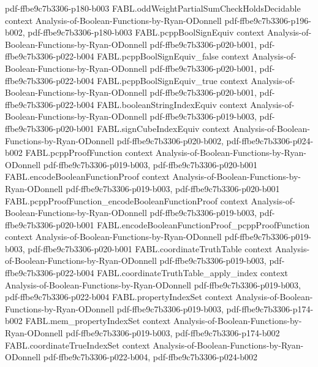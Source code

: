 \begin{theorem}
  {pdf-ffbe9c7b3306-p180-b003}
\proofstep
  {FABL.oddWeightPartialSumCheckHoldsDecidable}
  {context}
  {Analysis-of-Boolean-Functions-by-Ryan-ODonnell}
  {pdf-ffbe9c7b3306-p196-b002,
    pdf-ffbe9c7b3306-p180-b003}
\proofstep
  {FABL.pcppBoolSignEquiv}
  {context}
  {Analysis-of-Boolean-Functions-by-Ryan-ODonnell}
  {pdf-ffbe9c7b3306-p020-b001,
    pdf-ffbe9c7b3306-p022-b004}
\proofstep
  {FABL.pcppBoolSignEquiv_false}
  {context}
  {Analysis-of-Boolean-Functions-by-Ryan-ODonnell}
  {pdf-ffbe9c7b3306-p020-b001,
    pdf-ffbe9c7b3306-p022-b004}
\proofstep
  {FABL.pcppBoolSignEquiv_true}
  {context}
  {Analysis-of-Boolean-Functions-by-Ryan-ODonnell}
  {pdf-ffbe9c7b3306-p020-b001,
    pdf-ffbe9c7b3306-p022-b004}
\proofstep
  {FABL.booleanStringIndexEquiv}
  {context}
  {Analysis-of-Boolean-Functions-by-Ryan-ODonnell}
  {pdf-ffbe9c7b3306-p019-b003,
    pdf-ffbe9c7b3306-p020-b001}
\proofstep
  {FABL.signCubeIndexEquiv}
  {context}
  {Analysis-of-Boolean-Functions-by-Ryan-ODonnell}
  {pdf-ffbe9c7b3306-p020-b002,
    pdf-ffbe9c7b3306-p024-b002}
\proofstep
  {FABL.pcppProofFunction}
  {context}
  {Analysis-of-Boolean-Functions-by-Ryan-ODonnell}
  {pdf-ffbe9c7b3306-p019-b003,
    pdf-ffbe9c7b3306-p020-b001}
\proofstep
  {FABL.encodeBooleanFunctionProof}
  {context}
  {Analysis-of-Boolean-Functions-by-Ryan-ODonnell}
  {pdf-ffbe9c7b3306-p019-b003,
    pdf-ffbe9c7b3306-p020-b001}
\proofstep
  {FABL.pcppProofFunction_encodeBooleanFunctionProof}
  {context}
  {Analysis-of-Boolean-Functions-by-Ryan-ODonnell}
  {pdf-ffbe9c7b3306-p019-b003,
    pdf-ffbe9c7b3306-p020-b001}
\proofstep
  {FABL.encodeBooleanFunctionProof_pcppProofFunction}
  {context}
  {Analysis-of-Boolean-Functions-by-Ryan-ODonnell}
  {pdf-ffbe9c7b3306-p019-b003,
    pdf-ffbe9c7b3306-p020-b001}
\proofstep
  {FABL.coordinateTruthTable}
  {context}
  {Analysis-of-Boolean-Functions-by-Ryan-ODonnell}
  {pdf-ffbe9c7b3306-p019-b003,
    pdf-ffbe9c7b3306-p022-b004}
\proofstep
  {FABL.coordinateTruthTable_apply_index}
  {context}
  {Analysis-of-Boolean-Functions-by-Ryan-ODonnell}
  {pdf-ffbe9c7b3306-p019-b003,
    pdf-ffbe9c7b3306-p022-b004}
\proofstep
  {FABL.propertyIndexSet}
  {context}
  {Analysis-of-Boolean-Functions-by-Ryan-ODonnell}
  {pdf-ffbe9c7b3306-p019-b003,
    pdf-ffbe9c7b3306-p174-b002}
\proofstep
  {FABL.mem_propertyIndexSet}
  {context}
  {Analysis-of-Boolean-Functions-by-Ryan-ODonnell}
  {pdf-ffbe9c7b3306-p019-b003,
    pdf-ffbe9c7b3306-p174-b002}
\proofstep
  {FABL.coordinateTrueIndexSet}
  {context}
  {Analysis-of-Boolean-Functions-by-Ryan-ODonnell}
  {pdf-ffbe9c7b3306-p022-b004,
    pdf-ffbe9c7b3306-p024-b002}

\end{theorem}
